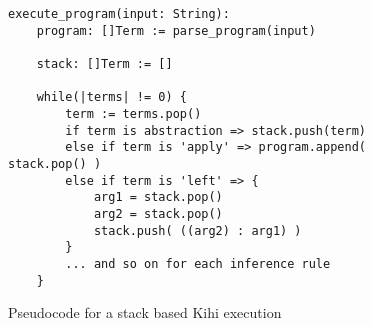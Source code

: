 \begin{figure}[htb]
    \centering
    \begin{lstlisting}
execute_program(input: String):
    program: []Term := parse_program(input)
    
    stack: []Term := []
    
    while(|terms| != 0) {
        term := terms.pop()
        if term is abstraction => stack.push(term)
        else if term is 'apply' => program.append( stack.pop() )
        else if term is 'left' => {
            arg1 = stack.pop()
            arg2 = stack.pop()
            stack.push( ((arg2) : arg1) )
        }
        ... and so on for each inference rule
    }
    \end{lstlisting}
    \caption{Pseudocode for a stack based Kihi execution}
    \label{fig:stack_pseudocode}
\end{figure}